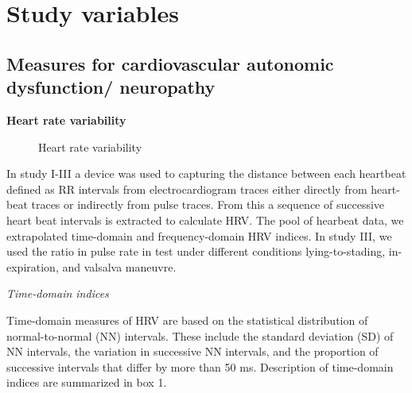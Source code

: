 \documentclass[
  a4paper,
  headsepline=true,
  open=any]{scrbook}
\begin{document}

\hypertarget{study-variables}{%
\chapter{Study variables}\label{study-variables}}

\hypertarget{measures-for-cardiovascular-autonomic-dysfunction-neuropathy}{%
\section{Measures for cardiovascular autonomic dysfunction/
neuropathy}\label{measures-for-cardiovascular-autonomic-dysfunction-neuropathy}}

\textbf{Heart rate variability}

\begin{figure}

\begin{minipage}[t]{\linewidth}

{\centering 


\caption{Heart rate variability}

}

\end{minipage}%

\end{figure}

In study I-III a device was used to capturing the distance between each
heartbeat defined as RR intervals from electrocardiogram traces either
directly from heart-beat traces or indirectly from pulse traces. From
this a sequence of successive heart beat intervals is extracted to
calculate HRV. The pool of hearbeat data, we extrapolated time-domain
and frequency-domain HRV indices. In study III, we used the ratio in
pulse rate in test under different conditions lying-to-stading, in-
expiration, and valsalva maneuvre.

\emph{Time-domain indices}

Time-domain measures of HRV are based on the statistical distribution of
normal-to-normal (NN) intervals. These include the standard deviation
(SD) of NN intervals, the variation in successive NN intervals, and the
proportion of successive intervals that differ by more than 50 ms.
Description of time-domain indices are summarized in box 1.
\end{document}
